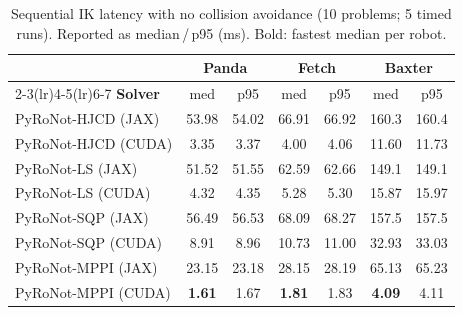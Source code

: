 \begin{table}[t]
\centering
\caption{Sequential IK latency with no collision avoidance (10 problems; 5 timed runs). Reported as median\,/\,p95 (ms). Bold: fastest median per robot.}
\label{tab:ik_seq_nocoll}
\small
\begin{tabular}{lcccccc}
\toprule
\multicolumn{1}{c}{} & \multicolumn{2}{c}{\textbf{Panda}} & \multicolumn{2}{c}{\textbf{Fetch}} & \multicolumn{2}{c}{\textbf{Baxter}} \\
\cmidrule(lr){2-3}\cmidrule(lr){4-5}\cmidrule(lr){6-7}
\textbf{Solver} & med & p95 & med & p95 & med & p95 \\
\midrule
PyRoNot-HJCD (JAX) & 53.98 & 54.02 & 66.91 & 66.92 & 160.3 & 160.4 \\
PyRoNot-HJCD (CUDA) & 3.35 & 3.37 & 4.00 & 4.06 & 11.60 & 11.73 \\
\midrule
PyRoNot-LS (JAX) & 51.52 & 51.55 & 62.59 & 62.66 & 149.1 & 149.1 \\
PyRoNot-LS (CUDA) & 4.32 & 4.35 & 5.28 & 5.30 & 15.87 & 15.97 \\
\midrule
PyRoNot-SQP (JAX) & 56.49 & 56.53 & 68.09 & 68.27 & 157.5 & 157.5 \\
PyRoNot-SQP (CUDA) & 8.91 & 8.96 & 10.73 & 11.00 & 32.93 & 33.03 \\
\midrule
PyRoNot-MPPI (JAX) & 23.15 & 23.18 & 28.15 & 28.19 & 65.13 & 65.23 \\
PyRoNot-MPPI (CUDA) & \textbf{1.61} & 1.67 & \textbf{1.81} & 1.83 & \textbf{4.09} & 4.11 \\
\midrule
\midrule
\bottomrule
\end{tabular}
\end{table}